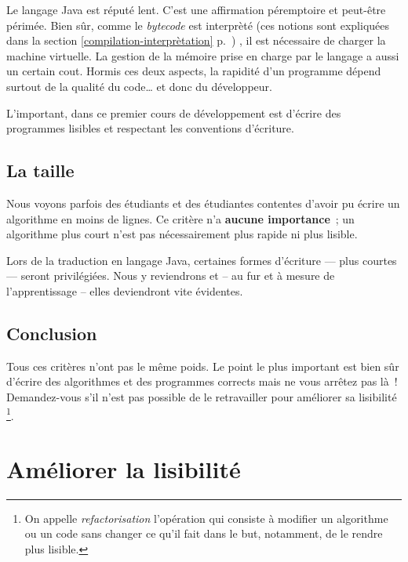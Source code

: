 			Le langage Java est réputé lent. C'est une affirmation péremptoire
			et peut-être périmée. Bien sûr, comme le \textit{bytecode} est
			interprèté (ces notions sont expliquées dans la section 
			\ref{compilation-interprètation} 
			p.~\pageref{compilation-interprètation})
			, il est nécessaire de charger la machine virtuelle. La
			gestion de la mémoire prise en charge par le langage a aussi un
			certain cout. Hormis ces deux aspects, la rapidité d'un programme
			dépend surtout de la qualité du code… et donc du développeur.  

			L'important, dans ce premier cours de développement est d'écrire des 
			programmes lisibles et  respectant les conventions d'écriture. 
			
		\subsection{La taille}
		
			Nous voyons parfois des étudiants et des étudiantes contentes
			d’avoir pu écrire un algorithme en moins de lignes.  Ce critère n’a
			\textbf{aucune importance}~; un algorithme plus court n’est pas
			nécessairement plus rapide ni plus lisible.

			Lors de la traduction en langage Java, certaines formes d'écriture
			— plus courtes — seront privilégiées. Nous y reviendrons et -- au fur
			et à mesure de l'apprentissage -- elles deviendront vite évidentes.
		
		\subsection{Conclusion}
			
			Tous ces critères n’ont pas le même poids.  Le point le plus
			important est bien sûr d’écrire des algorithmes et des programmes
			corrects mais ne vous arrêtez pas là~!  Demandez-vous s’il n’est pas
			possible de le retravailler pour améliorer sa lisibilité%
			\footnote{%
				On appelle \emph{refactorisation} l’opération qui consiste
				à modifier un algorithme ou un code sans changer ce qu’il fait
				dans le but, notamment, de le rendre plus lisible.
			}.
		
	\section{Améliorer la lisibilité}
	\label{lisibilite}
		
